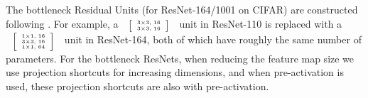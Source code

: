 \documentclass[runningheads]{llncs}
\begin{document}
\newcommand{\blocka}[1]{\tiny \begin{tabular}{c} \(\left[\begin{array}{c}\text{3$\times$3, #1}\\ \text{3$\times$3, #1} \end{array}\right]\)\end{tabular}
}
\newcommand{\blockb}[2]{\tiny \begin{tabular}{c} \(\left[\begin{array}{c}\text{1$\times$1, #2}\\[-.1em] \text{3$\times$3, #2}\\[-.1em] \text{1$\times$1, #1}\end{array}\right]\)\end{tabular}
}

The bottleneck Residual Units (for ResNet-164/1001 on CIFAR) are constructed following \cite{He2016}. For example, a $\blocka{16}$ unit in ResNet-110 is replaced with a $\blockb{64}{16}$ unit in ResNet-164, both of which have roughly the same number of parameters. For the bottleneck ResNets, when reducing the feature map size we use projection shortcuts \cite{He2016} for increasing dimensions, and when pre-activation is used, these projection shortcuts are also with pre-activation.



\end{document}
